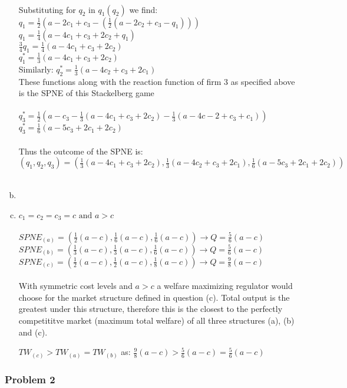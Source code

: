\documentclass[a4paper]{article}
\begin{document}
\begin{enumerate}[(a)]
\\
Substituting for $q_2$ in $q_1(q_2)$ we find:\\
$q_1=\frac{1}{2}(a-2c_1+c_3-(\frac{1}{2}(a-2c_2+c_3-q_1)))$\\
$q_1=\frac{1}{4}(a-4c_1+c_3+2c_2+q_1)$\\
$\frac{3}{4}q_1=\frac{1}{4}(a-4c_1+c_3+2c_2)$\\
$q_1^*=\frac{1}{3}(a-4c_1+c_3+2c_2)$\\
Similarly: $q_2^*=\frac{1}{3}(a-4c_2+c_3+2c_1)$\\
These functions along with the reaction function of firm 3 as specified above is the SPNE of this Stackelberg game\\
\\
$q_3^*=\frac{1}{2}(a-c_3-\frac{1}{3}(a-4c_1+c_3+2c_2)-\frac{1}{3}(a-4c-2+c_3+c_1))$\\
$q_3^*=\frac{1}{6}(a-5c_3+2c_1+2c_2)$\\
\\
Thus the outcome of the SPNE is:\\
$(q_1,q_2,q_3)=(\frac{1}{3}(a-4c_1+c_3+2c_2),\frac{1}{3}(a-4c_2+c_3+2c_1),\frac{1}{6}(a-5c_3+2c_1+2c_2))$\\
\\
\item
\item
$c_1=c_2=c_3=c \text{ and } a>c$\\
\\
$SPNE_{(a)}=(\frac{1}{2}(a-c),\frac{1}{6}(a-c),\frac{1}{6}(a-c))\rightarrow Q=\frac{5}{6}(a-c)$\\
$SPNE_{(b)}=(\frac{1}{3}(a-c),\frac{1}{3}(a-c),\frac{1}{6}(a-c))\rightarrow Q=\frac{5}{6}(a-c)$\\
$SPNE_{(c)}=(\frac{1}{2}(a-c),\frac{1}{2}(a-c),\frac{1}{8}(a-c))\rightarrow Q=\frac{9}{8}(a-c)$\\
\\
With symmetric cost levels and $a>c$ a welfare maximizing regulator would choose for the market structure defined in question (c). Total output is the greatest under this structure, therefore this is the closest to the perfectly competititve market (maximum total welfare) of all three structures (a), (b) and (c). 

$TW_{(c)}>TW_{(a)}=TW_{(b)}$ as: $\frac{9}{8}(a-c)>\frac{5}{6}(a-c)=\frac{5}{6}(a-c)$
\end{enumerate}
\subsubsection{Problem 2}
\end{document}
